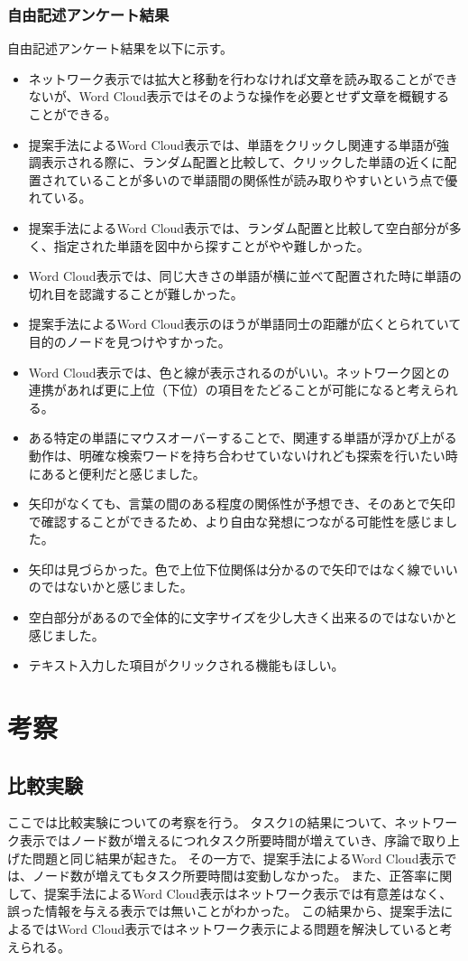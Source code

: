 \documentclass[syuuron]{kuee}
\begin{document}
		\subsection{自由記述アンケート結果}
		自由記述アンケート結果を以下に示す。
		\begin{itemize}
			\item ネットワーク表示では拡大と移動を行わなければ文章を読み取ることができないが、Word Cloud表示ではそのような操作を必要とせず文章を概観することができる。
			\item 提案手法によるWord Cloud表示では、単語をクリックし関連する単語が強調表示される際に、ランダム配置と比較して、クリックした単語の近くに配置されていることが多いので単語間の関係性が読み取りやすいという点で優れている。
			\item 提案手法によるWord Cloud表示では、ランダム配置と比較して空白部分が多く、指定された単語を図中から探すことがやや難しかった。
			\item Word Cloud表示では、同じ大きさの単語が横に並べて配置された時に単語の切れ目を認識することが難しかった。
			\item 提案手法によるWord Cloud表示のほうが単語同士の距離が広くとられていて目的のノードを見つけやすかった。
			\item Word Cloud表示では、色と線が表示されるのがいい。ネットワーク図との連携があれば更に上位（下位）の項目をたどることが可能になると考えられる。
			\item ある特定の単語にマウスオーバーすることで、関連する単語が浮かび上がる動作は、明確な検索ワードを持ち合わせていないけれども探索を行いたい時にあると便利だと感じました。
			\item 矢印がなくても、言葉の間のある程度の関係性が予想でき、そのあとで矢印で確認することができるため、より自由な発想につながる可能性を感じました。
			\item 矢印は見づらかった。色で上位下位関係は分かるので矢印ではなく線でいいのではないかと感じました。
			\item 空白部分があるので全体的に文字サイズを少し大きく出来るのではないかと感じました。
			\item テキスト入力した項目がクリックされる機能もほしい。
		\end{itemize}
			
\chapter{考察}
	\section{比較実験}
	ここでは比較実験についての考察を行う。
	タスク1の結果について、ネットワーク表示ではノード数が増えるにつれタスク所要時間が増えていき、序論で取り上げた問題と同じ結果が起きた。
	その一方で、提案手法によるWord Cloud表示では、ノード数が増えてもタスク所要時間は変動しなかった。
	また、正答率に関して、提案手法によるWord Cloud表示はネットワーク表示では有意差はなく、誤った情報を与える表示では無いことがわかった。
	この結果から、提案手法によるではWord Cloud表示ではネットワーク表示による問題を解決していると考えられる。
	
\end{document}
